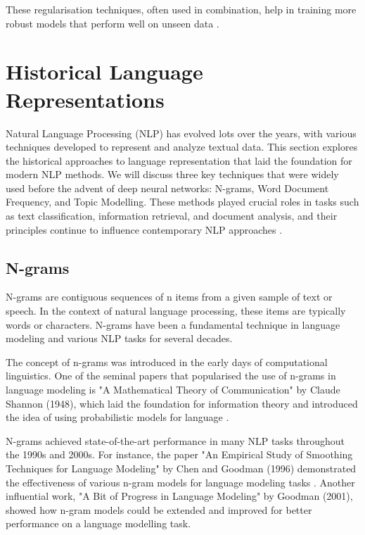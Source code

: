 \documentclass[a4paper, oneside]{discothesis}
\begin{document}
These regularisation techniques, often used in combination, help in training more robust models that perform well on unseen data \cite{kukavcka2017regularization}.

\section{Historical Language Representations}

Natural Language Processing (NLP) has evolved lots over the years, with various techniques developed to represent and analyze textual data. This section explores the historical approaches to language representation that laid the foundation for modern NLP methods. We will discuss three key techniques that were widely used before the advent of deep neural networks: N-grams, Word Document Frequency, and Topic Modelling. These methods played crucial roles in tasks such as text classification, information retrieval, and document analysis, and their principles continue to influence contemporary NLP approaches \cite{manning1999foundations}.

\subsection{N-grams}
N-grams are contiguous sequences of n items from a given sample of text or speech. In the context of natural language processing, these items are typically words or characters. N-grams have been a fundamental technique in language modeling and various NLP tasks for several decades.

The concept of n-grams was introduced in the early days of computational linguistics. One of the seminal papers that popularised the use of n-grams in language modeling is "A Mathematical Theory of Communication" by Claude Shannon (1948), which laid the foundation for information theory and introduced the idea of using probabilistic models for language \cite{shannon1948mathematical}.

N-grams achieved state-of-the-art performance in many NLP tasks throughout the 1990s and 2000s. For instance, the paper "An Empirical Study of Smoothing Techniques for Language Modeling" by Chen and Goodman (1996) demonstrated the effectiveness of various n-gram models for language modeling tasks \cite{chen1996empirical}. Another influential work, "A Bit of Progress in Language Modeling" by Goodman (2001), showed how n-gram models could be extended and improved for better performance on a language modelling task\cite{goodman2001bit}.
\end{document}
